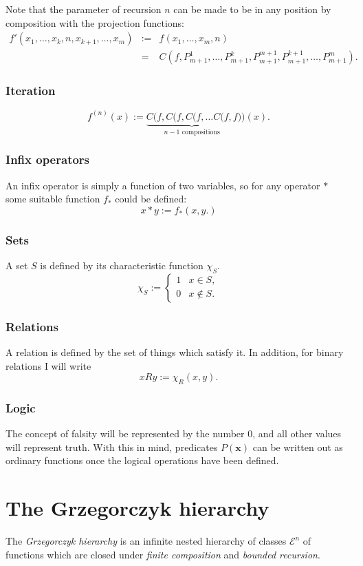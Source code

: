 \documentclass[a4paper]{article}
\newcommand{\grz}[1]{$\mathcal{E}^{#1}$}	%
\newcommand{\xvec}{\mathbf{x}}	%
\theoremstyle{plain}
\theoremstyle{definition}
\begin{document}
Note that the parameter of recursion $n$ can be made to be in any position by composition with the projection functions:
\begin{eqnarray*}
 f'(x_1, \dots, x_k, n, x_{k+1}, \dots, x_m) &:=& f(x_1, \dots, x_m, n) \\
 &=& C(f, P_{m+1}^1, \dots, P_{m+1}^k, P_{m+1}^{m+1}, P_{m+1}^{k+1},\dots, P_{m+1}^m).
 \end{eqnarray*}

\subsubsection*{Iteration}
\[f^{(n)}(x) := \underbrace{C(f,C(f,C(f, \dots C(f,f}_{n-1 \textrm{ compositions}}) )(x).\]

\subsubsection*{Infix operators}
An infix operator is simply a function of two variables, so for any operator $\ast$ some suitable function $f_{\ast}$ could be defined:
\[x \ast y := f_{\ast}(x,y.) \]

\subsubsection*{Sets}
A set $S$ is defined by its characteristic function $\chi_S$.
\[\chi_S := \begin{cases}
 1 & x \in S, \\
 0 & x \notin S.
 \end{cases}
\]

\subsubsection*{Relations}
A relation is defined by the set of things which satisfy it. In addition, for binary relations I will write
\[ x R y := \chi_R(x,y). \]

\subsubsection*{Logic}
The concept of falsity will be represented by the number $0$, and all other values will represent truth. With this in mind, predicates $P(\xvec)$ can be written out as ordinary functions once the logical operations have been defined.

\section{The Grzegorczyk hierarchy}
The {\it Grzegorczyk hierarchy} is an infinite nested hierarchy of classes \grz{n} of functions which are closed under {\it finite composition} and {\it bounded recursion}. 
\end{document}
